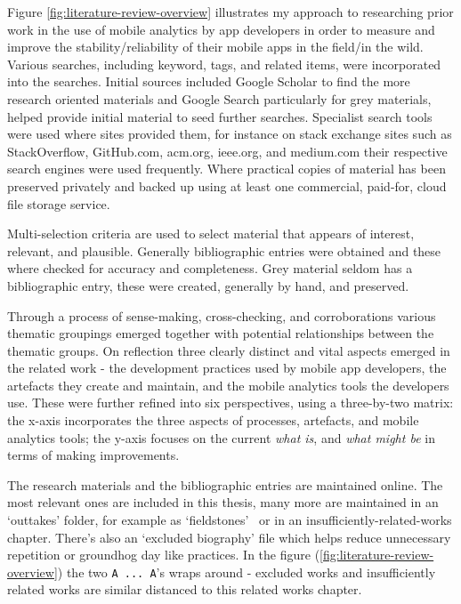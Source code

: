 Figure \ref{fig:literature-review-overview} illustrates my approach to researching prior work in the use of mobile analytics by app developers in order to measure and improve the stability/reliability of their mobile apps in the field/in the wild. Various searches, including keyword, tags, and related items, were incorporated into the searches. Initial sources included Google Scholar to find the more research oriented materials and Google Search particularly for grey materials, helped provide initial material to seed further searches. Specialist search tools were used where sites provided them, for instance on stack exchange sites such as StackOverflow, GitHub.com, acm.org, ieee.org, and medium.com their respective search engines were used frequently. Where practical copies of material has been preserved privately and backed up using at least one commercial, paid-for, cloud file storage service.

Multi-selection criteria are used to select material that appears of interest, relevant, and plausible. Generally bibliographic entries were obtained and these where checked for accuracy and completeness. Grey material seldom has a bibliographic entry, these were created, generally by hand, and preserved.

Through a process of sense-making, cross-checking, and corroborations various thematic groupings emerged together with potential relationships between the thematic groups. On reflection three clearly distinct and vital aspects emerged in the related work - the development practices used by mobile app developers, the artefacts they create and maintain, and the mobile analytics tools the developers use. These were further refined into six perspectives, using a three-by-two matrix: the x-axis incorporates the three aspects of processes, artefacts, and mobile analytics tools; the y-axis focuses on the current \emph{what is}, and \emph{what might be} in terms of making improvements.

The research materials and the bibliographic entries are maintained online. The most relevant ones are included in this thesis, many more are maintained in an `outtakes' folder, for example as `fieldstones'~ or in an insufficiently-related-works chapter. There's also an `excluded biography' file which helps reduce unnecessary repetition or groundhog day like practices. In the figure (\ref{fig:literature-review-overview}) the two \texttt{A ... A}'s wraps around - excluded works and insufficiently related works are similar distanced to this related works chapter.

